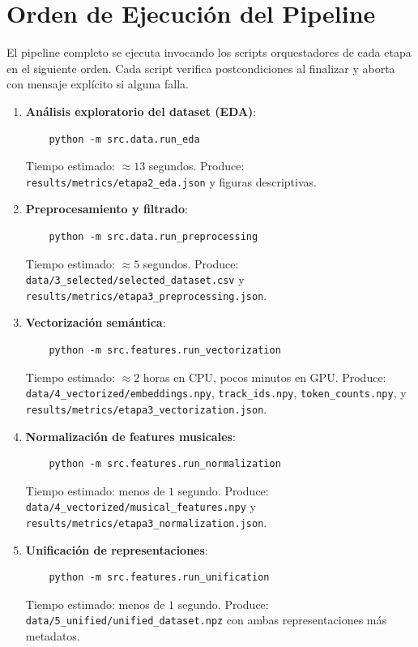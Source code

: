 \section{Orden de Ejecución del Pipeline}

El pipeline completo se ejecuta invocando los scripts orquestadores de cada etapa en el siguiente orden. Cada script verifica postcondiciones al finalizar y aborta con mensaje explícito si alguna falla.

\begin{enumerate}[leftmargin=2em]
    \item \textbf{Análisis exploratorio del dataset (EDA)}:
    \begin{verbatim}
    python -m src.data.run_eda
    \end{verbatim}
    Tiempo estimado: $\approx 13$ segundos. Produce: \texttt{results/metrics/etapa2\_eda.json} y figuras descriptivas.

    \item \textbf{Preprocesamiento y filtrado}:
    \begin{verbatim}
    python -m src.data.run_preprocessing
    \end{verbatim}
    Tiempo estimado: $\approx 5$ segundos. Produce: \texttt{data/3\_selected/selected\_dataset.csv} y \texttt{results/metrics/etapa3\_preprocessing.json}.

    \item \textbf{Vectorización semántica}:
    \begin{verbatim}
    python -m src.features.run_vectorization
    \end{verbatim}
    Tiempo estimado: $\approx 2$ horas en CPU, pocos minutos en GPU. Produce: \texttt{data/4\_vectorized/embeddings.npy}, \texttt{track\_ids.npy}, \texttt{token\_counts.npy}, y \texttt{results/metrics/etapa3\_vectorization.json}.

    \item \textbf{Normalización de features musicales}:
    \begin{verbatim}
    python -m src.features.run_normalization
    \end{verbatim}
    Tiempo estimado: menos de $1$ segundo. Produce: \texttt{data/4\_vectorized/musical\_features.npy} y \texttt{results/metrics/etapa3\_normalization.json}.

    \item \textbf{Unificación de representaciones}:
    \begin{verbatim}
    python -m src.features.run_unification
    \end{verbatim}
    Tiempo estimado: menos de $1$ segundo. Produce: \texttt{data/5\_unified/unified\_dataset.npz} con ambas representaciones más metadatos.


\end{enumerate}
